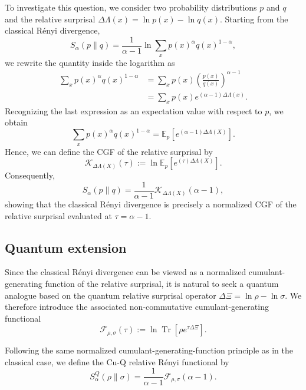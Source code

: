 \documentclass[a4paper, amsfonts, amssymb, amsmath, reprint, showkeys, nofootinbib, twoside, aps, pra]{revtex4-2}
\theoremstyle{definition}
\begin{document}
To investigate this question, we consider two probability distributions $p$ and $q$ and the relative surprisal $\Delta\Lambda(x)=\ln p(x)-\ln q(x)$. Starting from the classical Rényi divergence,
\begin{equation}
S_\alpha(p\|q) =\frac{1}{\alpha-1}\ln\sum_x p(x)^\alpha
q(x)^{1-\alpha},
\end{equation}
we rewrite the quantity inside the logarithm as
\begin{align}
\sum_x p(x)^\alpha q(x)^{1-\alpha}
&=
\sum_x p(x)\left(\frac{p(x)}{q(x)} \right)^{\alpha-1}
\nonumber\\
&=
\sum_xp(x)e^{(\alpha-1)\Delta\Lambda(x)}.
\end{align}
Recognizing the last expression as an expectation value with respect to
$p$, we obtain
\begin{equation}
\sum_x
p(x)^\alpha
q(x)^{1-\alpha}
=
\mathbb E_p
\!\left[
e^{(\alpha-1)\Delta\Lambda(X)}
\right].
\end{equation}
Hence, we can define the CGF of the relative surprisal by
\begin{equation}
\mathcal K_{\Delta\Lambda(X)}(\tau)
:=
\ln
\mathbb E_p
\!\left[
e^{(\tau)\Delta\Lambda(X)}
\right].
\end{equation}
Consequently,
\begin{equation}
S_\alpha(p\|q)
=
\frac{1}{\alpha-1}
\mathcal K_{\Delta\Lambda(X)}
(\alpha-1),
\end{equation}
showing that the classical Rényi divergence is precisely a normalized CGF of the relative surprisal evaluated at $\tau=\alpha-1$.

\subsection{Quantum extension}

Since the classical Rényi divergence can be viewed as a normalized cumulant-generating function of the relative surprisal, it is natural to seek a quantum analogue based on the quantum relative surprisal
operator $\Delta\Xi= \ln\rho-\ln\sigma$. We therefore introduce the associated non-commutative
cumulant-generating functional
\begin{equation}
\mathcal F_{\rho,\sigma}(\tau)
:=
\ln
\operatorname{Tr}
\!\left[
\rho
e^{\tau\Delta\Xi}
\right].
\end{equation}

Following the same normalized cumulant-generating-function principle as in the classical case, we define the Cu-Q relative Rényi functional by
\begin{equation}
S_\alpha^Q(\rho\|\sigma)
=
\frac{1}{\alpha-1}
\mathcal F_{\rho,\sigma}(\alpha-1).
\end{equation}
\end{document}
